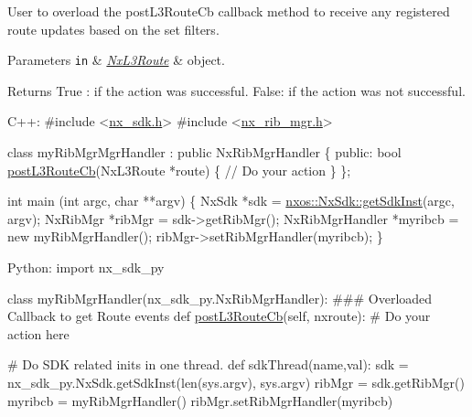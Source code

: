 User to overload the post\+L3\+Route\+Cb callback method to receive any registered route updates based on the set filters. 
\begin{DoxyParams}[1]{Parameters}
\mbox{\tt in}  & {\em \mbox{\hyperlink{classnxos_1_1_nx_l3_route}{Nx\+L3\+Route}}} & object.\\
\hline
\end{DoxyParams}
\begin{DoxyReturn}{Returns}
True \+: if the action was successful. False\+: if the action was not successful.
\end{DoxyReturn}

\begin{DoxyCode}
C++:
\textcolor{preprocessor}{   #include <\mbox{\hyperlink{nx__sdk_8h}{nx\_sdk.h}}>}
\textcolor{preprocessor}{   #include <\mbox{\hyperlink{nx__rib__mgr_8h}{nx\_rib\_mgr.h}}>}

   \textcolor{keyword}{class }myRibMgrMgrHandler : \textcolor{keyword}{public} NxRibMgrHandler \{
      \textcolor{keyword}{public}:
         \textcolor{keywordtype}{bool} \mbox{\hyperlink{classnxos_1_1_nx_rib_mgr_handler_a1b742d50365fdece0ea47eb38300f7de}{postL3RouteCb}}(NxL3Route *route) \{
              \textcolor{comment}{// Do your action}
         \}
   \};

   \textcolor{keywordtype}{int}  main (\textcolor{keywordtype}{int} argc, \textcolor{keywordtype}{char} **argv)
   \{
        NxSdk    *sdk = \mbox{\hyperlink{classnxos_1_1_nx_sdk_a5050e2d26c40744b4fc7862068a83f39}{nxos::NxSdk::getSdkInst}}(argc, argv);
        NxRibMgr *ribMgr = sdk->getRibMgr();
        NxRibMgrHandler *myribcb = \textcolor{keyword}{new} myRibMgrHandler();
        ribMgr->setRibMgrHandler(myribcb);
   \}

Python:
   \textcolor{keyword}{import} nx\_sdk\_py

   \textcolor{keyword}{class }myRibMgrHandler(nx\_sdk\_py.NxRibMgrHandler):
\textcolor{preprocessor}{   ### Overloaded Callback to get Route events}
         def \mbox{\hyperlink{classnxos_1_1_nx_rib_mgr_handler_a1b742d50365fdece0ea47eb38300f7de}{postL3RouteCb}}(self, nxroute):
\textcolor{preprocessor}{             # Do your action here}

\textcolor{preprocessor}{   # Do SDK related inits in one thread.}
   def sdkThread(name,val):
       sdk = nx\_sdk\_py.NxSdk.getSdkInst(len(sys.argv), sys.argv)
       ribMgr = sdk.getRibMgr()
       myribcb = myRibMgrHandler()
       ribMgr.setRibMgrHandler(myribcb)
\end{DoxyCode}
 \mbox{\label{classnxos_1_1_nx_rib_mgr_handler_ac3b189923604f553505b0741b8acd39d}} 
